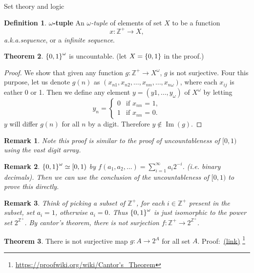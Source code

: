 \documentclass{report}
\newcommand*{\link}[1]{\href{#1}{(\underline{link})}%
  \footnote{\url{#1}}}
\newtheorem*{remark}{Remark}
\theoremstyle{definition}
\newtheorem{theorem}{Theorem}[chapter]
\newtheorem{definition}[theorem]{Definition}
\newcommand{\set}[1]{\ensuremath\left\{#1\right\}}
\newcommand{\ie}{\textit{i.e.}\xspace}
\newcommand{\aka}{\textit{a.k.a.}\xspace}
\newcommand{\ZZ}{\mathbb{Z}}
\begin{document}
\begin{chapter}{Set theory and logic}
  \begin{definition}{\textbf{$\omega$-tuple}}
    An \emph{$\omega$-tuple} of elements of set $X$ to be a function
    $$x:\ZZ^+\to X,$$
    \aka \emph{sequence}, or a \emph{infinite sequence}.
  \end{definition}

  \begin{theorem}
    $\set{0,1}^\omega$ is uncountable. (let $X=\set{0,1}$ in the proof.)
  \end{theorem}
  \begin{proof}
    We show that given any function $g:\ZZ^+\to X^\omega$, $g$ is not
    surjective. Four this purpose, let us denote $g(n)$ as
    $(x_{n1},x_{n2},\ldots,x_{nn},\ldots,x_{n\omega})$, where each $x_{ij}$ is
    eather 0 or 1. Then we define any element $y=(y1,\ldots,y_\omega)$
    of $X^\omega$ by letting
    \begin{equation*}
      y_n=
      \begin{cases}
        0 & \text{if $x_{nn}$ = 1}, \\
        1 & \text{if $x_{nn}$ = 0}.
      \end{cases}
    \end{equation*}
    $y$ will differ $g(n)$ for all $n$ by a digit. Therefore
    $y\not\in \operatorname{Im}(g)$.
  \end{proof}
  \begin{remark}
    Note this proof is similar to the proof of uncountableness of
    $[0,1)$ using the vast digit array.
  \end{remark}
  \begin{remark}
    $\set{0,1}^\omega
    \simeq [0,1)$ by $f(a_1,a_2,\ldots)=\sum_{i=1}^\infty{a_i
      2^{-i}}$. (\ie binary decimals). Then we can use the conclusion
    of the uncountableness of $[0,1)$ to prove this directly.
  \end{remark}
  \begin{remark}
    Think of picking a subset of $\ZZ^+$, for each $i\in\ZZ^+$ present in
    the subset, set $a_i=1$, otherwise $a_i=0$. Thus
    $\set{0,1}^\omega$ is just isomorphic to the power set
    $2^{\ZZ^+}$. By cantor's theorem, there is not surjection
    $f : \ZZ^+\to 2^{\ZZ^+}$.
  \end{remark}

  \begin{theorem}
    There is not surjective map $g:A\to 2^A$ for all set $A$. Proof:~\link{https://proofwiki.org/wiki/Cantor's_Theorem}
  \end{theorem}



\end{chapter}
\end{document}
